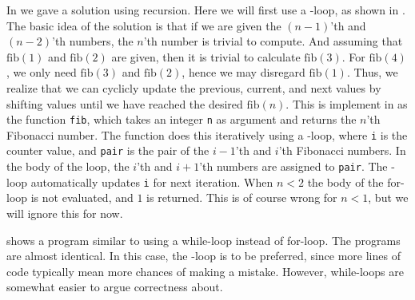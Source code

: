 \documentclass[fsharpNotes.tex]{subfiles}
\begin{document}
In  we gave a solution using recursion. Here we will first use a -loop, as shown in .
%
%
The basic idea of the solution is that if we are given the $(n-1)$'th and $(n-2)$'th numbers, the $n$'th number is trivial to compute. And assuming that $\text{fib}(1)$ and $\text{fib}(2)$ are given, then it is trivial to calculate $\text{fib}(3)$. For $\text{fib}(4)$, we only need $\text{fib}(3)$ and $\text{fib}(2)$, hence we may disregard $\text{fib}(1)$. Thus, we realize that we can cyclicly update the previous, current, and next values by shifting values until we have reached the desired $\text{fib}(n)$. This is implement in  as the function \lstinline{fib}, which takes an integer \lstinline{n} as argument and returns the $n$'th Fibonacci number. The function does this iteratively using a -loop, where \lstinline{i} is the counter value, and \lstinline{pair} is the pair of the $i-1$'th and $i$'th Fibonacci numbers. In the body of the loop, the $i$'th and $i+1$'th numbers are assigned to \lstinline{pair}. The -loop automatically updates \lstinline{i} for next iteration. When $n<2$ the body of the for-loop is not evaluated, and $1$ is returned. This is of course wrong for $n < 1$, but we will ignore this for now.

 shows a program similar to  using a while-loop instead of for-loop.
%
%
The programs are almost identical. In this case, the -loop is to be preferred, since more lines of code typically mean more chances of making a mistake.  However, while-loops are somewhat easier to argue correctness about.
\end{document}
